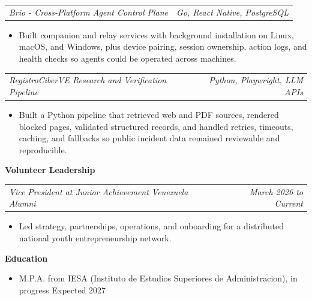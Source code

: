 \documentclass[10pt,letterpaper]{article}
\makeatletter
\newcommand{\bodyfont}{\fontsize{10.5}{15.75}\selectfont}
\newcommand{\sectiontitle}[1]{%
  \vspace{4pt}
  {\bodyfont\textbf{#1}}\par
  \nopagebreak[4]
  \vspace{2pt}
}
\newcommand{\roleline}[2]{%
  \begin{tabularx}{\textwidth}{@{}Xr@{}}
    \bodyfont\textit{#1} & \bodyfont\textit{#2}
  \end{tabularx}
  \nopagebreak[4]
  \vspace{1pt}
}
\makeatother
\begin{document}
\vspace{3pt}
\roleline{Brio - Cross-Platform Agent Control Plane}{Go, React Native, PostgreSQL}
\begin{itemize}
  \item Built companion and relay services with background installation on Linux, macOS, and Windows, plus device pairing, session ownership, action logs, and health checks so agents could be operated across machines.
\end{itemize}

\vspace{3pt}
\roleline{RegistroCiberVE Research and Verification Pipeline}{Python, Playwright, LLM APIs}
\begin{itemize}
  \item Built a Python pipeline that retrieved web and PDF sources, rendered blocked pages, validated structured records, and handled retries, timeouts, caching, and fallbacks so public incident data remained reviewable and reproducible.
\end{itemize}

\sectiontitle{Volunteer Leadership}

\roleline{Vice President at Junior Achievement Venezuela Alumni}{March 2026 to Current}
\begin{itemize}
  \item Led strategy, partnerships, operations, and onboarding for a distributed national youth entrepreneurship network.
\end{itemize}

\sectiontitle{Education}
\begin{itemize}
  \item M.P.A. from IESA (Instituto de Estudios Superiores de Administracion), in progress \hfill Expected 2027
\end{itemize}
\end{document}

